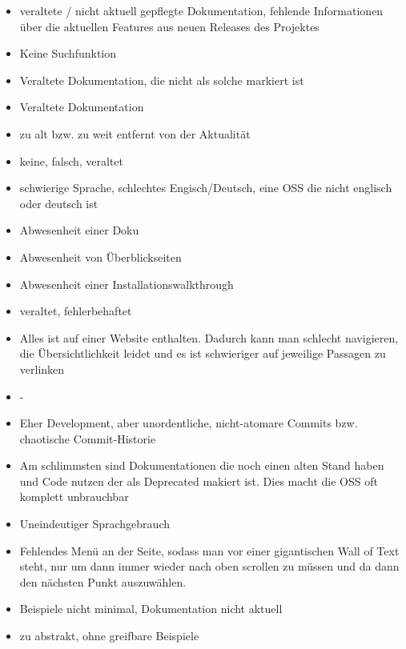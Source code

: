 \begin{multicols}{2}
\begin{itemize}
        \item veraltete / nicht aktuell gepflegte Dokumentation, fehlende Informationen über die aktuellen Features aus neuen Releases des Projektes
        \item Keine Suchfunktion
        \item Veraltete Dokumentation, die nicht als solche markiert ist
        \item Veraltete Dokumentation
        \item zu alt bzw. zu weit entfernt von der Aktualität
        \item keine, falsch, veraltet
        \item schwierige Sprache, schlechtes Engisch/Deutsch, eine OSS die nicht englisch oder deutsch ist
        \item Abwesenheit einer Doku
        \item Abwesenheit von Überblickseiten
        \item Abwesenheit einer Installationswalkthrough
        \item veraltet, fehlerbehaftet
        \item Alles ist auf einer Website enthalten. Dadurch kann man schlecht navigieren, die Übersichtlichkeit leidet und es ist schwieriger auf jeweilige Passagen zu verlinken
        \item -
        \item Eher Development, aber unordentliche, nicht-atomare Commits bzw. chaotische Commit-Historie
        \item Am schlimmsten sind Dokumentationen die noch einen alten Stand haben und Code nutzen der als Deprecated makiert ist. Dies macht die OSS oft komplett unbrauchbar
        \item Uneindeutiger Sprachgebrauch
        \item Fehlendes Menü an der Seite, sodass man vor einer gigantischen Wall of Text steht, nur um dann immer wieder nach oben scrollen zu müssen und da dann den nächsten Punkt auszuwählen.
        \item Beispiele nicht minimal, Dokumentation nicht aktuell
        \item zu abstrakt, ohne greifbare Beispiele
    \end{itemize}
\end{multicols}
